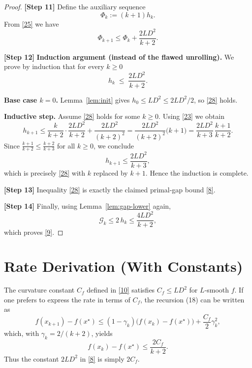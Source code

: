 \documentclass{article}
\newcommand{\gap}{\mathcal{G}}
\begin{document}
\begin{proof}
\noindent\textbf{[Step 11]} Define the auxiliary sequence
\[
\Phi_k := (k+1)h_k .
\tag{26}
\]
From \eqref{25} we have
\[
\Phi_{k+1}\le \Phi_k + \frac{2L D^{2}}{k+2}.
\tag{27}
\]

\noindent\textbf{[Step 12]} \textbf{Induction argument (instead of the flawed unrolling).}  
We prove by induction that for every $k\ge 0$
\[
h_k\;\le\;\frac{2L D^{2}}{k+2}.
\tag{28}
\]

\noindent\textbf{Base case $k=0$.}  
Lemma~\ref{lem:init} gives $h_0\le L D^{2}\le 2L D^{2}/2$, so \eqref{28} holds.

\noindent\textbf{Inductive step.}  
Assume \eqref{28} holds for some $k\ge 0$. Using \eqref{23} we obtain
\[
h_{k+1}
\le \frac{k}{k+2}\cdot\frac{2L D^{2}}{k+2}
      +\frac{2L D^{2}}{(k+2)^{2}}
= \frac{2L D^{2}}{(k+2)^{2}}\bigl(k+1\bigr)
= \frac{2L D^{2}}{k+3}\,\frac{k+1}{k+2}.
\]
Since $\displaystyle\frac{k+1}{k+2}\le \frac{k+2}{k+3}$ for all $k\ge 0$, we conclude
\[
h_{k+1}\le \frac{2L D^{2}}{k+3},
\]
which is precisely \eqref{28} with $k$ replaced by $k+1$. Hence the induction is complete.

\noindent\textbf{[Step 13]} Inequality \eqref{28} is exactly the claimed primal‑gap bound \eqref{8}.

\noindent\textbf{[Step 14]} Finally, using Lemma~\ref{lem:gap-lower} again,
\[
\gap_k \le 2\,h_k \le \frac{4L D^{2}}{k+2},
\]
which proves \eqref{9}.  \qedhere
\end{proof}

\section*{Rate Derivation (With Constants)}
The curvature constant $C_f$ defined in \eqref{10} satisfies $C_f\le L D^{2}$ for $L$‑smooth $f$.  
If one prefers to express the rate in terms of $C_f$, the recursion (18) can be written as
\[
f(x_{k+1})-f(x^\star)\le (1-\gamma_k)\bigl(f(x_k)-f(x^\star)\bigr)+\frac{C_f}{2}\gamma_k^{2},
\]
which, with $\gamma_k=2/(k+2)$, yields
\[
f(x_k)-f(x^\star)\le \frac{2C_f}{k+2}.
\]
Thus the constant $2LD^{2}$ in \eqref{8} is simply $2C_f$.
\end{document}
